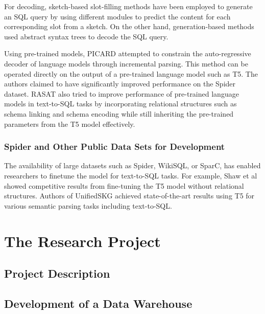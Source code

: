 \documentclass[conference]{IEEEtran}
\begin{document}
For decoding, sketch-based slot-filling methods \cite{Hwang2019AContextualization,Xu2017SQLNet:Learning,Choi2020RYANSQL:Databases} have been employed to generate an SQL query by using different modules to predict the content for each corresponding slot from a sketch. On the other hand, generation-based methods \cite{Guo2019TowardsRepresentation,Wang2019RAT-SQL:Parsers,Cao2021LGESQL:Relations} used abstract syntax trees to decode the SQL query. 

Using pre-trained models, PICARD \cite{Scholak2021PICARD:Models} attempted to constrain the auto-regressive decoder of language models through incremental parsing. This method can be operated directly on the output of a pre-trained language model such as T5. The authors claimed to have significantly improved performance on the Spider dataset. RASAT \cite{Qi2022RASAT:Text-to-SQL} also tried to improve performance of pre-trained language models in text-to-SQL tasks by incorporating relational structures such as schema linking and schema encoding while still inheriting the pre-trained parameters from the T5 model effectively.

\subsubsection{Spider and Other Public Data Sets for Development}

The availability of large datasets such as Spider, WikiSQL, or SparC, has enabled researchers to finetune the model for text-to-SQL tasks. For example, Shaw et al \cite{Shaw2020CompositionalBoth} showed competitive results from fine-tuning the T5 model without relational structures. Authors of UnifiedSKG \cite{Xie2022UnifiedSKG:Models} achieved state-of-the-art results using T5 for various semantic parsing tasks including text-to-SQL.

\section{The Research Project}

\subsection{Project Description}

\subsection{Development of a Data Warehouse}
\end{document}
